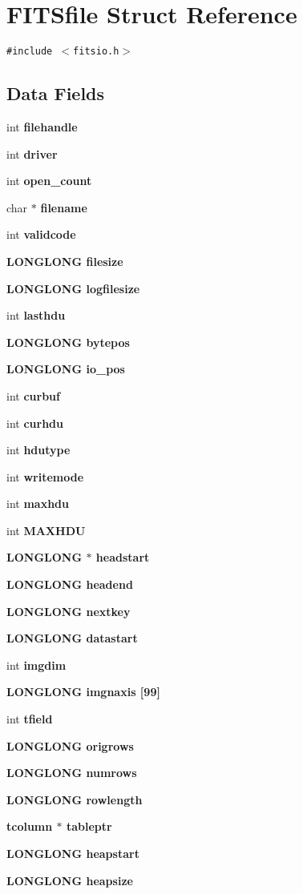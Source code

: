 \section{FITSfile Struct Reference}
\label{structFITSfile}
{\tt \#include $<$fitsio.h$>$}

\subsection*{Data Fields}
\begin{CompactItemize}
\item 
int \bf{filehandle}
\item 
int \bf{driver}
\item 
int \bf{open\_\-count}
\item 
char $\ast$ \bf{filename}
\item 
int \bf{validcode}
\item 
\bf{LONGLONG} \bf{filesize}
\item 
\bf{LONGLONG} \bf{logfilesize}
\item 
int \bf{lasthdu}
\item 
\bf{LONGLONG} \bf{bytepos}
\item 
\bf{LONGLONG} \bf{io\_\-pos}
\item 
int \bf{curbuf}
\item 
int \bf{curhdu}
\item 
int \bf{hdutype}
\item 
int \bf{writemode}
\item 
int \bf{maxhdu}
\item 
int \bf{MAXHDU}
\item 
\bf{LONGLONG} $\ast$ \bf{headstart}
\item 
\bf{LONGLONG} \bf{headend}
\item 
\bf{LONGLONG} \bf{nextkey}
\item 
\bf{LONGLONG} \bf{datastart}
\item 
int \bf{imgdim}
\item 
\bf{LONGLONG} \bf{imgnaxis} [99]
\item 
int \bf{tfield}
\item 
\bf{LONGLONG} \bf{origrows}
\item 
\bf{LONGLONG} \bf{numrows}
\item 
\bf{LONGLONG} \bf{rowlength}
\item 
\bf{tcolumn} $\ast$ \bf{tableptr}
\item 
\bf{LONGLONG} \bf{heapstart}
\item 
\bf{LONGLONG} \bf{heapsize}

\end{CompactItemize}
